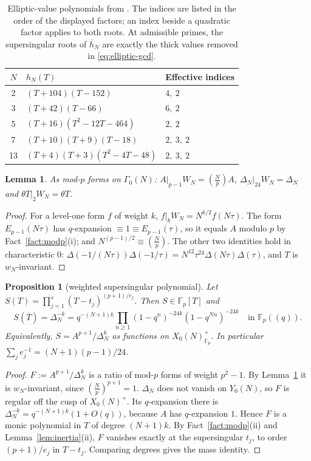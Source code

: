 \documentclass[11pt,a4paper]{article}
\numberwithin{equation}{section}
\newtheorem{proposition}[theorem]{Proposition}
\newtheorem{lemma}[theorem]{Lemma}
\theoremstyle{definition}
\theoremstyle{remark}
\newcommand{\Fp}{\mathbb F_p}
\newcommand{\Lp}[1]{\left(\frac{#1}{p}\right)}
\begin{document}
\begin{table}[htbp]\centering
\begin{tabular}{cll}\toprule
$N$ & $h_N(T)$ & Effective indices\\\midrule
2 & $(T+104)(T-152)$ & $4,\ 2$\\
3 & $(T+42)(T-66)$ & $6,\ 2$\\
5 & $(T+16)(T^2-12T-464)$ & $2,\ 2$\\
7 & $(T+10)(T+9)(T-18)$ & $2,\ 3,\ 2$\\
13 & $(T+4)(T+3)(T^2-4T-48)$ & $2,\ 3,\ 2$\\\bottomrule
\end{tabular}
\caption{Elliptic-value polynomials from \citet{JST19}.
The indices are listed in the order of the displayed factors; an index
beside a quadratic factor applies to both roots. At admissible primes,
the supersingular roots of $\overline h_N$ are exactly the thick values
removed in \eqref{eq:elliptic-gcd}.}
\label{tab:elliptic-values}
\end{table}

\begin{lemma}\label{lem:AW}
As mod-$p$ forms on $\Gamma_0(N)$: $A|_{p-1}W_N=\Lp{N}A$, $\Delta_N|_{24}W_N=\Delta_N$ and
$\theta T|_2W_N=\theta T$.
\end{lemma}
\begin{proof}
For a level-one form $f$ of weight $k$, $f|_kW_N=N^{k/2}f(N\tau)$. The form $E_{p-1}(N\tau)$ has
$q$-expansion $\equiv1\equiv E_{p-1}(\tau)$, so it equals $A$ modulo $p$ by Fact~\ref{fact:modp}(i);
and $N^{(p-1)/2}\equiv\Lp N$. The other two identities hold in characteristic $0$:
$\Delta(-1/(N\tau))\Delta(-1/\tau)=N^{12}\tau^{24}\Delta(N\tau)\Delta(\tau)$, and $T$ is
$w_N$-invariant.
\end{proof}

\begin{proposition}[weighted supersingular polynomial]\label{prop:S}
Let $S(T)=\prod_{j=1}^s(T-t_j)^{(p+1)/e_j}$. Then $S\in\Fp[T]$ and
\[
S(\overline T)=\Delta_N^{-k}=q^{-(N+1)k}\prod_{n\ge1}(1-q^n)^{-24k}(1-q^{Nn})^{-24k}\quad\text{in }\Fp((q)).
\]
Equivalently, $S=A^{p+1}/\Delta_N^{k}$ as functions on $X_0(N)^+_{\Fp}$. In particular
$\sum_j e_j^{-1}=(N+1)(p-1)/24$.
\end{proposition}
\begin{proof}
$F:=A^{p+1}/\Delta_N^k$ is a ratio of mod-$p$ forms of weight $p^2-1$. By Lemma~\ref{lem:AW} it is
$w_N$-invariant, since $\Lp N^{p+1}=1$. $\Delta_N$ does not vanish on $Y_0(N)$, so $F$ is regular off the cusp of
$X_0(N)^+$. Its $q$-expansion there is $\Delta_N^{-k}=q^{-(N+1)k}(1+O(q))$, because $A$ has
$q$-expansion $1$. Hence $F$ is a monic polynomial in $T$ of degree $(N+1)k$. By
Fact~\ref{fact:modp}(ii) and Lemma~\ref{lem:inertia}(ii), $F$ vanishes exactly at the supersingular
$t_j$, to order $(p+1)/e_j$ in $T-t_j$. Comparing degrees gives the mass identity.
\end{proof}
\end{document}
